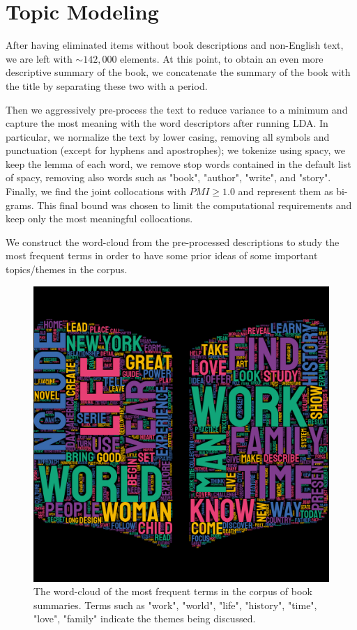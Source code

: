 \documentclass[a4paper,10pt, openright]{article}
\begin{document}
\section{Topic Modeling }

After having eliminated items without book descriptions and non-English text, we are left with $\sim 142,000$ elements. At this point, to obtain an even more descriptive summary of the book, we concatenate the summary of the book with the title by separating these two with a period.

Then we aggressively pre-process the text to reduce variance to a minimum and capture the most meaning with the word descriptors after running LDA. In particular, we normalize the text by lower casing, removing all symbols and punctuation (except for hyphens and apostrophes); we tokenize using spacy, we keep the lemma of each word, we remove stop words contained in the default list of spacy, removing also words such as "book", "author", "write", and "story". Finally, we find the joint collocations with $PMI \ge 1.0$ and represent them as bi-grams. This final bound was chosen to limit the computational requirements and keep only the most meaningful collocations. 

We construct the word-cloud from the pre-processed descriptions to study the most frequent terms in order to have some prior ideas of some important topics/themes in the corpus. 

\begin{figure}[H]
	\begin{center}
		\includegraphics[width=12 cm, height=9 cm]{./Images/wordcloud.png}
		\caption{The word-cloud of the most frequent terms in the corpus of book summaries. Terms such as "work", "world", "life", "history", "time", "love", "family" indicate the themes being discussed.}
		\label{fig:ldaword}
	\end{center}
\end{figure}
\end{document}
